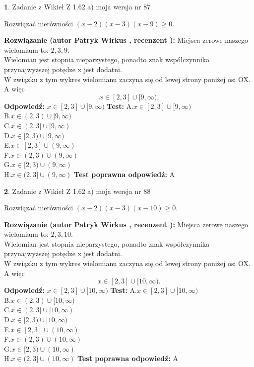 \documentclass[12pt, a4paper]{article}
\theoremstyle{definition} %
\newtheorem{zad}{}
\newcommand{\zadStart}[1]{\begin{zad}#1\newline}
\newcommand{\zadStop}{\end{zad}}
\newcommand{\rozwStart}[2]{\noindent \textbf{Rozwiązanie (autor #1 , recenzent #2): }\newline}
\newcommand{\rozwStop}{\newline}
\newcommand{\odpStart}{\noindent \textbf{Odpowiedź:}\newline}
\newcommand{\odpStop}{\newline}
\newcommand{\testStart}{\noindent \textbf{Test:}\newline}
\newcommand{\testStop}{\newline}
\newcommand{\kluczStart}{\noindent \textbf{Test poprawna odpowiedź:}\newline}
\newcommand{\kluczStop}{\newline}
\begin{document}
\zadStart{Zadanie z Wikieł Z 1.62 a) moja wersja nr 87}

Rozwiązać nierówności $(x-2)(x-3)(x-9)\ge0$.
\zadStop
\rozwStart{Patryk Wirkus}{}
Miejsca zerowe naszego wielomianu to: $2, 3, 9$.\\
Wielomian jest stopnia nieparzystego, ponadto znak współczynnika przy\linebreak najwyższej potędze x jest dodatni.\\ W związku z tym wykres wielomianu zaczyna się od lewej strony poniżej osi OX. A więc $$x \in [2,3] \cup [9,\infty).$$
\rozwStop
\odpStart
$x \in [2,3] \cup [9,\infty)$
\odpStop
\testStart
A.$x \in [2,3] \cup [9,\infty)$\\
B.$x \in (2,3) \cup [9,\infty)$\\
C.$x \in (2,3] \cup [9,\infty)$\\
D.$x \in [2,3) \cup [9,\infty)$\\
E.$x \in [2,3] \cup (9,\infty)$\\
F.$x \in (2,3) \cup (9,\infty)$\\
G.$x \in [2,3) \cup (9,\infty)$\\
H.$x \in (2,3] \cup (9,\infty)$
\testStop
\kluczStart
A
\kluczStop



\zadStart{Zadanie z Wikieł Z 1.62 a) moja wersja nr 88}

Rozwiązać nierówności $(x-2)(x-3)(x-10)\ge0$.
\zadStop
\rozwStart{Patryk Wirkus}{}
Miejsca zerowe naszego wielomianu to: $2, 3, 10$.\\
Wielomian jest stopnia nieparzystego, ponadto znak współczynnika przy\linebreak najwyższej potędze x jest dodatni.\\ W związku z tym wykres wielomianu zaczyna się od lewej strony poniżej osi OX. A więc $$x \in [2,3] \cup [10,\infty).$$
\rozwStop
\odpStart
$x \in [2,3] \cup [10,\infty)$
\odpStop
\testStart
A.$x \in [2,3] \cup [10,\infty)$\\
B.$x \in (2,3) \cup [10,\infty)$\\
C.$x \in (2,3] \cup [10,\infty)$\\
D.$x \in [2,3) \cup [10,\infty)$\\
E.$x \in [2,3] \cup (10,\infty)$\\
F.$x \in (2,3) \cup (10,\infty)$\\
G.$x \in [2,3) \cup (10,\infty)$\\
H.$x \in (2,3] \cup (10,\infty)$
\testStop
\kluczStart
A
\kluczStop
\end{document}
